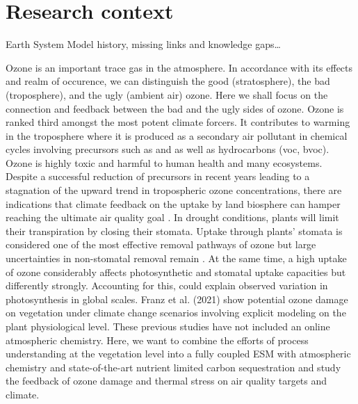 \documentclass[11pt, a4paper, oneside, article]{memoir}
\newcommand{\pcite}[1]{\parencite{#1}}
\begin{document}


\chapter{Research context}
Earth System Model history, missing links and knowledge gaps…

Ozone is an important trace gas in the atmosphere. In accordance with its effects and realm of occurence, we can distinguish the good (stratosphere), the bad (troposphere), and the ugly (ambient air) ozone. Here we shall focus on the connection and feedback between the bad and the ugly sides of ozone. Ozone is ranked third amongst the most potent climate forcers. It contributes to warming in the troposphere where it is produced as a secondary air pollutant in chemical cycles involving precursors such as  and  as well as hydrocarbons (\gls{voc}, \gls{bvoc}). Ozone is highly toxic and harmful to human health and many ecosystems. Despite a successful reduction of precursors in recent years leading to a stagnation of the upward trend in tropospheric ozone concentrations, there are indications that climate feedback on the uptake by land biosphere can hamper reaching the ultimate air quality goal \pcite{NCC:Lin2020}. In drought conditions, plants will limit their transpiration by closing their stomata. Uptake through plants’ stomata is considered one of the most effective removal pathways of ozone but large uncertainties in non-stomatal removal remain \pcite{RG:Clifton2020}. At the same time, a high uptake of ozone considerably affects photosynthetic and stomatal uptake capacities but differently strongly. Accounting for this, \cite{BGS:Lombardozzi2013} could explain observed variation in photosynthesis in global scales. Franz et al. (2021) show potential ozone damage on vegetation under climate change scenarios involving explicit modeling on the plant physiological level. These previous studies have not included an online atmospheric chemistry. Here, we want to combine the efforts of process understanding at the vegetation level into a fully coupled ESM with atmospheric chemistry and state-of-the-art nutrient limited carbon sequestration and study the feedback of ozone damage and thermal stress on air quality targets and climate.
\end{document}
